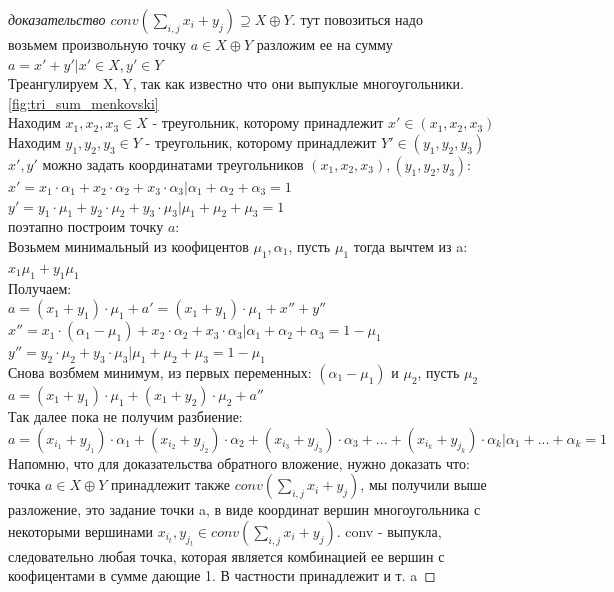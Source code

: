 \documentclass{article}
\begin{document}
\begin{proof}[доказательство $conv(\sum_{i,j} x_i + y_j) \supseteq X \oplus Y$] тут повозиться надо\\
    возьмем произвольную точку $a \in X \oplus Y$ разложим ее на сумму $a = x' + y' | x' \in X, y' \in Y$\\
    Треангулируем X, Y, так как известно что они выпуклые многоугольники. \autoref{fig:tri_sum_menkovski}\\
    Находим $x_1, x_2, x_3 \in X$ - треугольник, которому принадлежит $x' \in (x_1, x_2, x_3)$\\
    Находим $y_1, y_2, y_3 \in Y$ - треугольник, которому принадлежит $Y' \in (y_1, y_2, y_3)$\\
    $x', y'$ можно задать координатами треугольников $(x_1, x_2, x_3), (y_1, y_2, y_3)$:\\
    $x' = x_1 \cdot \alpha_1 + x_2 \cdot \alpha_2 + x_3 \cdot \alpha_3 | \alpha_1 + \alpha_2 + \alpha_3 = 1$\\
    $y' = y_1 \cdot \mu_1 + y_2 \cdot \mu_2 + y_3 \cdot \mu_3 | \mu_1 + \mu_2 + \mu_3 = 1$\\
    поэтапно построим точку $a$:\\
    Возьмем минимальный из коофицентов $\mu_1, \alpha_1$, пусть $\mu_1$ тогда вычтем из a: $x_1 \mu_1 + y_1 \mu_1$\\
    Получаем:\\
    $a = (x_1 + y_1) \cdot \mu_1 + a' = (x_1 + y_1) \cdot \mu_1 + x'' + y''$\\
    $x'' = x_1 \cdot (\alpha_1 - \mu_1) + x_2 \cdot \alpha_2 + x_3 \cdot \alpha_3 | \alpha_1 + \alpha_2 + \alpha_3 = 1 - \mu_1$\\
    $y'' = y_2 \cdot \mu_2 + y_3 \cdot \mu_3 | \mu_1 + \mu_2 + \mu_3 = 1 - \mu_1$\\
    Снова возбмем минимум, из первых переменных: $(\alpha_1 - \mu_1)$ и $\mu_2$, пусть $\mu_2$\\
    $a = (x_1 + y_1) \cdot \mu_1 + (x_1 + y_2) \cdot \mu_2 + a''$\\
    Так далее пока не получим разбиение:\\
    $a = (x_{i_1} + y_{j_1}) \cdot \alpha_1 + (x_{i_2} + y_{j_2}) \cdot \alpha_2 + (x_{i_3} + y_{j_3}) \cdot \alpha_3 + ... + (x_{i_k} + y_{j_k}) \cdot \alpha_k | \alpha_1 + ... + \alpha_k = 1$\\
    Напомню, что для доказательства обратного вложение, нужно доказать что:\\
    точка $a \in X \oplus Y$ принадлежит также $conv(\sum_{i, j} x_i + y_j)$, мы получили выше разложение, это задание точки a, в виде координат вершин многоугольника с некоторыми вершинами $x_{i_t}, y_{j_t} \in conv(\sum_{i, j} x_i + y_j)$. conv - выпукла, следовательно любая точка, которая является комбинацией ее вершин с коофицентами в сумме дающие 1. В частности принадлежит и т. a
\end{proof}
\end{document}
